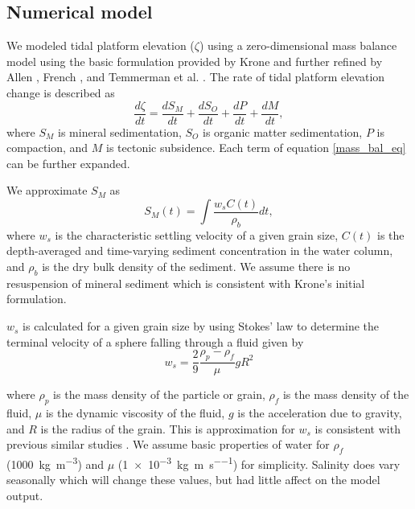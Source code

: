 \documentclass[9pt,twocolumn,twoside,lineno]{pnas-new}
\begin{document}

\subsection*{Numerical model}

We modeled tidal platform elevation ($\zeta$) using a zero-dimensional mass balance model using the basic formulation provided by Krone \cite{kroneMethodSimulatingMarsh1987} and further refined by Allen \cite{allenSaltmarshGrowthStratification1990}, French \cite{frenchNumericalSimulationVertical1993}, and Temmerman et al. \cite{temmermanModellingLongtermTidal2003,temmermanModellingEstuarineVariations2004}. The rate of tidal platform elevation change is described as
\begin{equation}\label{mass_bal_eq}
	\frac{d \zeta}{d t} = \frac{d S_M}{d t} + \frac{d S_O}{d t} + \frac{d P}{d t} + \frac{d M}{d t},
\end{equation}
where $S_M$ is mineral sedimentation, $S_O$ is organic matter sedimentation, $P$ is compaction, and $M$ is tectonic subsidence. Each term of equation \ref{mass_bal_eq} can be further expanded.

We approximate $S_M$ as
\begin{equation}\label{min_sed_eq}
	S_M(t) = \int{\frac{w_{s}C(t)}{\rho_b}dt},
\end{equation}
where $w_s$ is the characteristic settling velocity of a given grain size, $C(t)$ is the depth-averaged and time-varying sediment concentration in the water column, and $\rho_b$ is the dry bulk density of the sediment. We assume there is no resuspension of mineral sediment which is consistent with Krone's \cite{kroneMethodSimulatingMarsh1987} initial formulation.

$w_s$ is calculated for a given grain size by using Stokes' law to determine the terminal velocity of a sphere falling through a fluid given by
\begin{equation}\label{ws_eq}
	w_s =  \frac{2}{9}\frac{\rho_p - \rho_f}{\mu}gR^2
\end{equation}

where $\rho_p$ is the mass density of the particle or grain, $\rho_f$ is the mass density of the fluid, $\mu$ is the dynamic viscosity of the fluid, $g$ is the acceleration due to gravity, and $R$ is the radius of the grain. This is approximation for $w_s$ is consistent with previous similar studies \cite{allenSaltmarshGrowthStratification1990,temmermanModellingLongtermTidal2003,temmermanModellingEstuarineVariations2004}. We assume basic properties of water for $\rho_f$ (\SI{1000}{\kilo\gram\per\cubic\meter}) and $\mu$ (\SI{1e-3}{\kilo\gram\per\meter\per\second}) for simplicity. Salinity does vary seasonally which will change these values, but had little affect on the model output.
\end{document}
